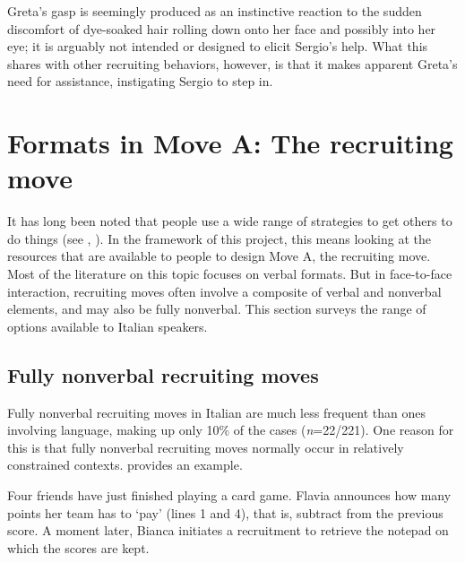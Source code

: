 \documentclass[output=paper,modfonts]{langscibook}
\begin{document}
Greta's gasp is seemingly produced as an instinctive reaction to the sudden discomfort of dye-soaked hair rolling down onto her face and possibly into her eye; it is arguably not intended or designed to elicit Sergio's help. What this shares with other recruiting behaviors, however, is that it makes apparent Greta's need for assistance, instigating Sergio to step in. %

\section{Formats in Move A: The recruiting move}\label{sec:rossi:3}

It has long been noted that people use a wide range of strategies to get others to do things (see , ). In the framework of this project, this means looking at the resources that are available to people to design Move A, the recruiting move. Most of the literature on this topic focuses on verbal formats. But in face-to-face interaction, recruiting moves often involve a composite of verbal and nonverbal elements, and may also be fully nonverbal. This section surveys the range of options available to Italian speakers.

\subsection{Fully nonverbal recruiting moves}\label{sec:rossi:3.1}
Fully nonverbal recruiting moves in Italian are much less frequent than ones involving language, making up only 10\% of the cases (\textit{n}=22/221). One reason for this is that fully nonverbal recruiting moves normally occur in relatively constrained contexts.  provides an example.

Four friends have just finished playing a card game. Flavia announces how many points her team has to ‘pay’ (lines 1 and 4), that is, subtract from the previous score. A moment later, Bianca initiates a recruitment to retrieve the notepad on which the scores are kept.
\end{document}
